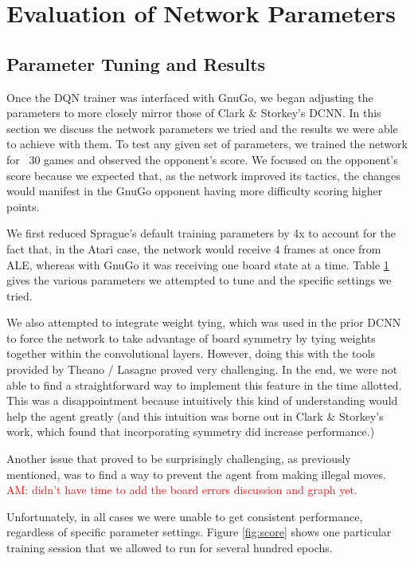 \section{Evaluation of Network Parameters}

\subsection*{Parameter Tuning and Results}

Once the DQN trainer was interfaced with GnuGo, we began adjusting the parameters to more closely mirror those of Clark \& Storkey's DCNN. In this section we discuss the network parameters we tried and the results we were able to achieve with them. To test any given set of parameters, we trained the network for ~30 games and observed the opponent's score. We focused on the opponent's score because we expected that, as the network improved its tactics, the changes would manifest in the GnuGo opponent having more difficulty scoring higher points.

We first reduced Sprague's default training parameters by 4x to account for the fact that, in the Atari case, the network would receive 4 frames at once from ALE, whereas with GnuGo it was receiving one board state at a time. Table \ref{} gives the various parameters we attempted to tune and the specific settings we tried.

We also attempted to integrate weight tying, which was used in the prior DCNN to force the network to take advantage of board symmetry by tying weights together within the convolutional layers. However, doing this with the tools provided by Theano / Lasagne proved very challenging. In the end, we were not able to find a straightforward way to implement this feature in the time allotted. This was a disappointment because intuitively this kind of understanding would help the agent greatly (and this intuition was borne out in Clark \& Storkey's work, which found that incorporating symmetry did increase performance.)

Another issue that proved to be surprisingly challenging, as previously mentioned, was to find a way to prevent the agent from making illegal moves. \textcolor{red}{AM: didn't have time to add the board errors discussion and graph yet.}

Unfortunately, in all cases we were unable to get consistent performance, regardless of specific parameter settings. Figure \ref{fig:score} shows one particular training session that we allowed to run for several hundred epochs. 

